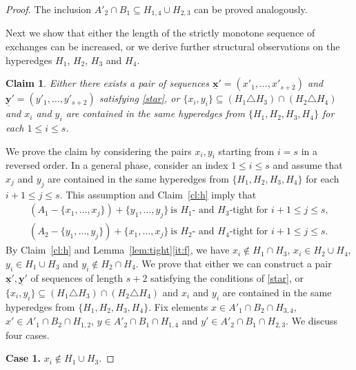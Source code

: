 \documentclass[11pt,a4paper]{article}
\theoremstyle{plain}
\newtheorem{cl}[thm]{Claim}
\theoremstyle{definition}
\newenvironment{claimproof}[1][\proofname]
  {%
    \proof[#1]%
      \renewcommand*\qedsymbol{$\bullet$}%
  }
  {%
    \endproof%
  }
\newcommand{\ul}[1]{\underline{\mathbf{#1}}}
\begin{document}
\begin{proof}
\begin{claimproof}
The inclusion $A'_2\cap B_1\subseteq H_{1,4}\cup H_{2,3}$ can be proved analogously. 
\end{claimproof}

Next we show that either the length of the strictly monotone sequence of exchanges can be increased, or we derive further structural observations on the hyperedges $H_1$, $H_2$, $H_3$ and $H_4$.

\begin{cl}\label{cl:schwarcz}
Either there exists a pair of sequences $\ul{x}'=(x'_1,\dots,x'_{s+2})$ and $\ul{y}'=(y'_1,\dots,y'_{s+2})$ satisfying \ref{star}, or $\{x_i,y_i\}\subseteq (H_1\triangle H_3)\cap (H_2\triangle H_4)$ and $x_i$ and $y_i$ are contained in the same hyperedges from $\{H_1,H_2,H_3,H_4\}$ for each $1 \le i \le s$. 
\end{cl}
\begin{claimproof}
We prove the claim by considering the pairs $x_i,y_i$ starting from $i=s$ in a reversed order. In a general phase, consider an index $1\leq i\leq s$ and assume that $x_j$ and $y_j$ are contained in the same hyperedges from $\{H_1, H_2, H_3, H_4\}$ for each $i+1 \le j \le s$. This assumption and Claim~\ref{cl:h} imply that 
\begin{gather*}
    (A_1-\{x_1,\dots,x_j\})+\{y_1,\dots,y_j\}\ \text{is $H_1$- and $H_3$-tight for $i+1\leq j\leq s$},\\ 
    (A_2-\{y_1,\dots,y_j\})+\{x_1,\dots,x_j\}\ \text{is $H_2$- and $H_4$-tight for $i+1\leq j\leq s$}.
\end{gather*} 
By Claim~\ref{cl:h} and Lemma~\ref{lem:tight}\ref{it:f}, we have $x_i \not \in H_1 \cap H_3$, $x_i \in H_2 \cup H_4$, $y_i \in H_1 \cup H_3$ and $y_i \not \in H_2\cap H_4$. We prove that either we can construct a pair $\ul{x}',\ul{y}'$ of sequences of length $s+2$ satisfying the conditions of \ref{star}, or $\{x_i, y_i\}\subseteq (H_1 \triangle H_3) \cap (H_2 \triangle H_4)$ and $x_i$ and $y_i$ are contained in the same hyperedges from $\{H_1,H_2,H_3,H_4\}$. Fix elements $x\in A'_1\cap B_2\cap H_{3,4}$, $x'\in A'_1\cap B_2\cap H_{1,2}$, $y\in A'_2\cap B_1\cap H_{1,4}$ and $y'\in A'_2\cap B_1\cap H_{2,3}$. We discuss four cases.
\smallskip

\noindent\textbf{Case 1.} $x_i \not \in H_1 \cup H_3$.


\end{claimproof}
\end{proof}
\end{document}
